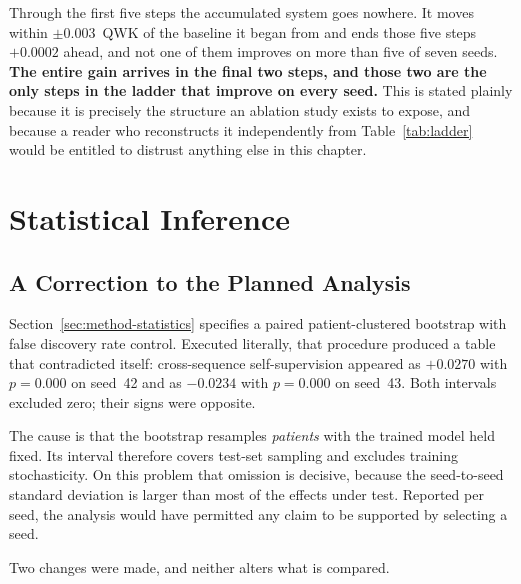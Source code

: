 \documentclass[12pt,a4paper]{report}
\begin{document}
\begin{table}[htbp]
\centering
\caption{Step-by-step decomposition from E0 to E7 over seven seeds.
\enquote{Seeds $+$} counts the seeds on which the step improved QWK.}
\label{tab:steps}

\end{table}

Through the first five steps the accumulated system goes nowhere. It moves
within $\pm 0.003$~QWK of the baseline it began from and ends those five steps
$+0.0002$ ahead, and not one of them improves on more than five of seven seeds.
\textbf{The entire gain arrives in the final two steps, and those two are the
only steps in the ladder that improve on every seed.} This is stated plainly because it
is precisely the structure an ablation study exists to expose, and because a
reader who reconstructs it independently from Table~\ref{tab:ladder} would be
entitled to distrust anything else in this chapter.

\section{Statistical Inference}
\label{sec:results-inference}

\subsection{A Correction to the Planned Analysis}

Section~\ref{sec:method-statistics} specifies a paired patient-clustered
bootstrap with false discovery rate control. Executed literally, that procedure
produced a table that contradicted itself: cross-sequence self-supervision
appeared as $+0.0270$ with $p = 0.000$ on seed~42 and as $-0.0234$ with
$p = 0.000$ on seed~43. Both intervals excluded zero; their signs were opposite.

The cause is that the bootstrap resamples \emph{patients} with the trained model
held fixed. Its interval therefore covers test-set sampling and excludes training
stochasticity. On this problem that omission is decisive, because the
seed-to-seed standard deviation is larger than most of the effects under test.
Reported per seed, the analysis would have permitted any claim to be supported by
selecting a seed.

Two changes were made, and neither alters what is compared.
\end{document}
